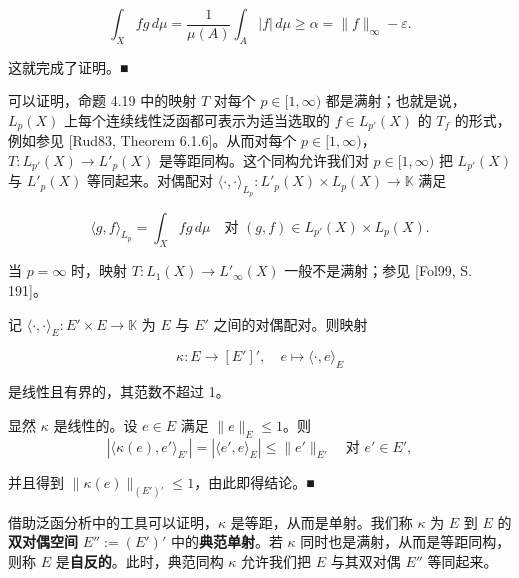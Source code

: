 \begin{proposition}
\begin{subitems}
\[
\int_X fg \, d\mu = \frac{1}{\mu(A)} \int_A |f| \, d\mu \ge \alpha = \|f\|_\infty - \varepsilon .
\]

这就完成了证明。\nobreak\hspace{0.35em}■

\end{subitems}

\end{proposition}

\begin{remark}

\begin{items}
\item

可以证明，命题 4.19 中的映射 $ T $ 对每个 $ p \in [1,\infty) $ 都是满射；也就是说，$ L_p(X) $ 上每个连续线性泛函都可表示为适当选取的 $ f \in L_{p'}(X) $ 的 $ T_f $ 的形式，例如参见 [Rud83, Theorem 6.1.6]。从而对每个 $ p \in [1,\infty) $，$ T: L_{p'}(X) \to L'_p(X) $ 是等距同构。这个同构允许我们对 $ p \in [1,\infty) $ 把 $ L_{p'}(X) $ 与 $ L'_p(X) $ 等同起来。对偶配对 $ \langle\cdot,\cdot\rangle_{L_p}: L'_p(X) \times L_p(X) \to \mathbb{K} $ 满足

\[
\langle g,f\rangle_{L_p} = \int_X f g \, d\mu \quad \text{对 } (g,f) \in L_{p'}(X) \times L_p(X) .
\]
\item

当 $ p = \infty $ 时，映射 $ T: L_1(X) \to L'_\infty(X) $ 一般不是满射；参见 [Fol99, S. 191]。

\item

记 $ \langle\cdot,\cdot\rangle_E: E' \times E \to \mathbb{K} $ 为 $ E $ 与 $ E' $ 之间的对偶配对。则映射

\[
\kappa: E \to [E']', \quad e \mapsto \langle\cdot,e\rangle_E
\]

是线性且有界的，其范数不超过 1。

\proofhead
显然 $ \kappa $ 是线性的。设 $ e \in E $ 满足 $ \|e\|_E \le 1 $。则
\[
|\langle\kappa(e),e'\rangle_{E'}| = |\langle e',e\rangle_E| \le \|e'\|_{E'} \quad \text{对 } e' \in E' ,
\]

并且得到 $ \|\kappa(e)\|_{(E')'} \le 1 $，由此即得结论。\nobreak\hspace{0.35em}■

\item

借助泛函分析中的工具可以证明，$ \kappa $ 是等距，从而是单射。我们称 $ \kappa $ 为 $ E $ 到 $ E $ 的\textbf{双对偶空间} $ E'' := (E')' $ 中的\textbf{典范单射}。若 $ \kappa $ 同时也是满射，从而是等距同构，则称 $ E $ 是\textbf{自反的}。此时，典范同构 $ \kappa $ 允许我们把 $ E $ 与其双对偶 $ E'' $ 等同起来。


\end{items}
\end{remark}
